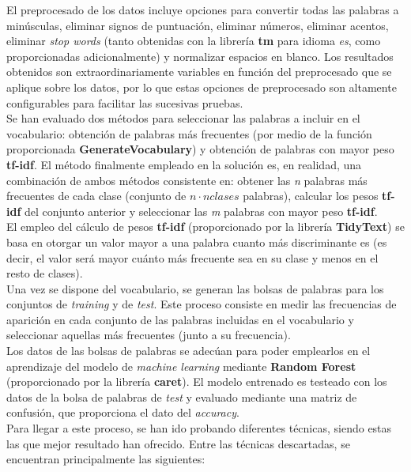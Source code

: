 \documentclass[11pt,a4paper]{article}
\begin{document}
El preprocesado de los datos incluye opciones para convertir todas las palabras a min\'usculas, eliminar signos de puntuaci\'on, eliminar n\'umeros, eliminar acentos, eliminar \textit{stop words} (tanto obtenidas con la librer\'ia \textbf{tm} para idioma \textit{es}, como proporcionadas adicionalmente) y normalizar espacios en blanco. Los resultados obtenidos son extraordinariamente variables en funci\'on del preprocesado que se aplique sobre los datos, por lo que estas opciones de preprocesado son altamente configurables para facilitar las sucesivas pruebas.\\
Se han evaluado dos m\'etodos para seleccionar las palabras a incluir en el vocabulario: obtenci\'on de palabras m\'as frecuentes (por medio de la funci\'on proporcionada \textbf{GenerateVocabulary}) y obtenci\'on de palabras con mayor peso \textbf{tf-idf}. El m\'etodo finalmente empleado en la soluci\'on es, en realidad, una combinaci\'on de ambos m\'etodos consistente en: obtener las \textit{n} palabras m\'as frecuentes de cada clase (conjunto de $n \cdot nclases$ palabras), calcular los pesos \textbf{tf-idf} del conjunto anterior y seleccionar las \textit{m} palabras con mayor peso \textbf{tf-idf}.\\
El empleo del c\'alculo de pesos \textbf{tf-idf} (proporcionado por la librer\'ia \textbf{TidyText}) se basa en otorgar un valor mayor a una palabra cuanto m\'as discriminante es (es decir, el valor ser\'a mayor cu\'anto m\'as frecuente sea en su clase y menos en el resto de clases).\\
Una vez se dispone del vocabulario, se generan las bolsas de palabras para los conjuntos de \textit{training} y de \textit{test}. Este proceso consiste en medir las frecuencias de aparici\'on en cada conjunto de las palabras incluidas en el vocabulario y seleccionar aquellas m\'as frecuentes (junto a su frecuencia).\\
Los datos de las bolsas de palabras se adec\'uan para poder emplearlos en el aprendizaje del modelo de \textit{machine learning} mediante \textbf{Random Forest} (proporcionado por la librer\'ia \textbf{caret}). El modelo entrenado es testeado con los datos de la bolsa de palabras de \textit{test} y evaluado mediante una matriz de confusi\'on, que proporciona el dato del \textit{accuracy}.\\
Para llegar a este proceso, se han ido probando diferentes t\'ecnicas, siendo estas las que mejor resultado han ofrecido. Entre las t\'ecnicas descartadas, se encuentran principalmente las siguientes:\\
\end{document}
